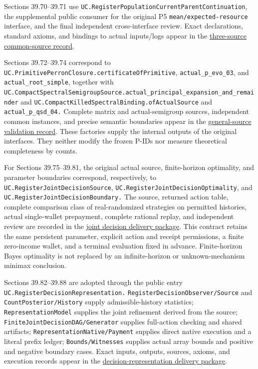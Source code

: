 \documentclass[
  english,
  11pt,
  oneside]{book}
\begin{document}
Sections 39.70--39.71 use \nolinkurl{UC.RegisterPopulationCurrentParentContinuation}, the supplemental public consumer for the original P5 \nolinkurl{mean/expected-resource} interface, and the final independent cross-interface review. Exact declarations, standard axioms, and bindings to actual inputs/logs appear in the \href{../formalization/ueot-core/docs/compression/theory_completion/unified_closure/finite_predictive_source_v1/SOURCE_VALIDATION.json}{three-source common-source record}.

Sections 39.72--39.74 correspond to \nolinkurl{UC.PrimitivePerronClosure.certificateOfPrimitive}, \nolinkurl{actual_p_evo_03}, and \nolinkurl{actual_root_simple}, together with \nolinkurl{UC.CompactSpectralSemigroupSource.actual_principal_expansion_and_remainder} and \nolinkurl{UC.CompactKilledSpectralBinding.ofActualSource} and \nolinkurl{actual_p_qsd_04.} Complete matrix and actual-semigroup sources, independent common instances, and precise semantic boundaries appear in the \href{../formalization/ueot-core/docs/compression/theory_completion/unified_closure/general_perron_compact_spectral_source_v1/SOURCE_VALIDATION.json}{general-source validation record}. These factories supply the internal outputs of the original interfaces. They neither modify the frozen P-IDs nor measure theoretical completeness by counts.

For Sections 39.75--39.81, the original actual source, finite-horizon optimality, and parameter boundaries correspond, respectively, to \nolinkurl{UC.RegisterJointDecisionSource}, \nolinkurl{UC.RegisterJointDecisionOptimality}, and \nolinkurl{UC.RegisterJointDecisionBoundary.} The source, returned action table, complete comparison class of real-randomized strategies on permitted histories, actual single-wallet prepayment, complete rational replay, and independent review are recorded in the \href{../formalization/ueot-core/docs/compression/theory_completion/unified_closure/joint_decision_closure_v1/README.md}{joint decision delivery package}. This contract retains the same persistent parameter, explicit action and receipt permissions, a finite zero-income wallet, and a terminal evaluation fixed in advance. Finite-horizon Bayes optimality is not replaced by an infinite-horizon or unknown-mechanism minimax conclusion.

Sections 39.82--39.88 are adopted through the public entry \nolinkurl{UC.RegisterDecisionRepresentation.} \nolinkurl{RegisterDecisionObserver/Source} and \nolinkurl{CountPosterior/History} supply admissible-history statistics; \nolinkurl{RepresentationModel} supplies the joint refinement derived from the source; \nolinkurl{FiniteJointDecisionDAG/Generator} supplies full-action checking and shared artifacts; \nolinkurl{RepresentationNative/Payment} supplies direct native execution and a literal prefix ledger; \nolinkurl{Bounds/Witnesses} supplies actual array bounds and positive and negative boundary cases. Exact inputs, outputs, sources, axioms, and execution records appear in the \href{../formalization/ueot-core/docs/compression/theory_completion/unified_closure/decision_representation_closure_v1/README.md}{decision-representation delivery package}.
\end{document}
